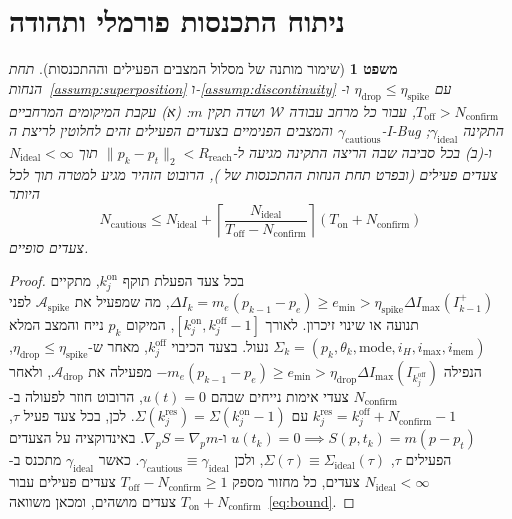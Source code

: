 \documentclass[10pt, a4paper, twocolumn]{article}
\newtheorem{theorem}{משפט}
\begin{document}
\section{ניתוח התכנסות פורמלי ותהודה}

\begin{theorem}[שימור מותנה של מסלול המצבים הפעילים וההתכנסות]
\label{thm:cautious}
תחת הנחות~\ref{assump:superposition} ו-\ref{assump:discontinuity} עם $\eta_{\text{drop}} \le \eta_{\text{spike}}$ ו-$T_{\text{off}} > N_{\text{confirm}}$, עבור כל מרחב עבודה $\mathcal{W}$ ושדה תקין $m$:
(א) עקבת המיקומים המרחביים $\gamma_{\text{cautious}}$ והמצבים הפנימיים בצעדים הפעילים זהים לחלוטין לריצת ה-\foreignlanguage{english}{I-Bug} התקינה $\gamma_{\text{ideal}}$; ו-(ב) בכל סביבה שבה הריצה התקינה מגיעה ל-$\|p_k - p_t\|_2 < R_{\text{reach}}$ תוך $N_{\text{ideal}} < \infty$ צעדים פעילים (ובפרט תחת הנחות ההתכנסות של \cite{taylor2014intensity}), הרובוט הזהיר מגיע למטרה תוך לכל היותר
\begin{equation}
    N_{\text{cautious}} \le N_{\text{ideal}} + \left\lceil \frac{N_{\text{ideal}}}{T_{\text{off}} - N_{\text{confirm}}} \right\rceil (T_{\text{on}} + N_{\text{confirm}})
    \label{eq:bound}
\end{equation}
צעדים סופיים.
\end{theorem}

\begin{proof}
בכל צעד הפעלת תוקף $k_j^{\text{on}}$, מתקיים $\Delta I_k = m_e(p_{k-1} - p_e) \ge e_{\min} > \eta_{\text{spike}}\Delta I_{\max}(I_{k-1}^+)$, מה שמפעיל את $\mathcal{A}_{\text{spike}}$ לפני תנועה או שינוי זיכרון. לאורך $[k_j^{\text{on}}, k_j^{\text{off}}-1]$, המיקום $p_k$ נייח והמצב המלא $\Sigma_k = (p_k, \theta_k, \text{mode}, i_H, i_{\text{max}}, i_{\text{mem}})$ נעול. בצעד הכיבוי $k_j^{\text{off}}$, מאחר ש-$\eta_{\text{drop}} \le \eta_{\text{spike}}$, הנפילה $-m_e(p_{k-1}-p_e) \ge e_{\min} > \eta_{\text{drop}}\Delta I_{\max}(I_{k_j^{\text{off}}}^-)$ מפעילה את $\mathcal{A}_{\text{drop}}$, ולאחר $N_{\text{confirm}}$ צעדי אימות נייחים שבהם $u(t)=0$, הרובוט חוזר לפעולה ב-$k_j^{\text{res}} = k_j^{\text{off}} + N_{\text{confirm}} - 1$ עם $\Sigma(k_j^{\text{res}}) = \Sigma(k_j^{\text{on}} - 1)$. לכן, בכל צעד פעיל $\tau$, $u(t_k) = 0 \implies S(p, t_k) = m(p - p_t)$ ו-$\nabla_p S = \nabla_p m$. באינדוקציה על הצעדים הפעילים $\tau$, $\Sigma(\tau) \equiv \Sigma_{\text{ideal}}(\tau)$, ולכן $\gamma_{\text{cautious}} \equiv \gamma_{\text{ideal}}$. כאשר $\gamma_{\text{ideal}}$ מתכנס ב-$N_{\text{ideal}} < \infty$ צעדים, כל מחזור מספק $T_{\text{off}} - N_{\text{confirm}} \ge 1$ צעדים פעילים עבור $T_{\text{on}} + N_{\text{confirm}}$ צעדים מושהים, ומכאן משוואה~\eqref{eq:bound}.
\end{proof}
\end{document}
